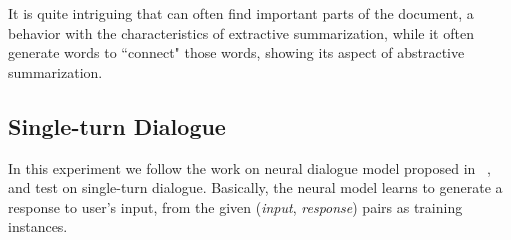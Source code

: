 It is quite intriguing that \copynet can often find important parts of the document, a behavior with the characteristics of extractive summarization, while it often  generate words to ``connect" those words, showing its aspect of abstractive summarization. %


\subsection{Single-turn Dialogue}
In this experiment we follow the work on neural dialogue model proposed in ~\cite{shang2015neural,vinyals2015neural,sordoni2015neural}, and test \copynet on single-turn dialogue. Basically, the neural model learns to generate a response to user's input, from the given (\textit{input}, \textit{response}) pairs as training instances.

